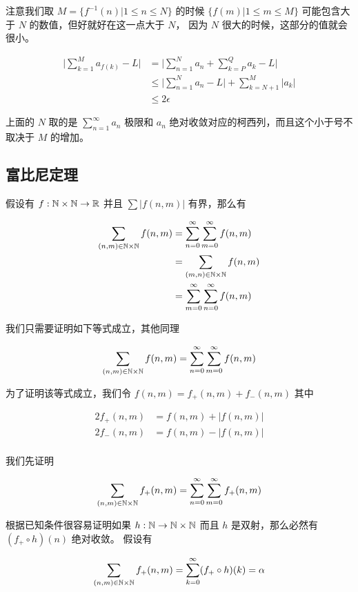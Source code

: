 注意我们取 $M = \{ f^{-1}(n) \vert 1 \le n \le N \} $ 的时候 $ \{ f(m) \vert 1 \le m \le M \}$ 可能包含大于 $N$ 的数值，但好就好在这一点大于 $N$，
因为 $N$ 很大的时候，这部分的值就会很小。

\begin{align*}
\lvert \sum_{k=1}^{M}a_{f(k)} - L \rvert & =  \lvert \sum_{n=1}^{N}a_{n} + \sum_{k=P}^{Q}a_{k} - L \rvert \\
& \le \lvert \sum_{n=1}^{N}a_n - L \rvert + \sum_{k=N+1}^{M}\lvert a_k \rvert \\
& \le 2\epsilon
\end{align*}

上面的 $N$ 取的是 $\sum_{n=1}^{\infty}a_n$ 极限和 $a_n$ 绝对收敛对应的柯西列，而且这个小于号不取决于 $M$ 的增加。

\subsection{富比尼定理}

假设有 $f: \mathbb{N} \times \mathbb{N} \to \mathbb{R}$ 并且 $\sum\lvert f(n,m) \rvert$ 有界，那么有

\begin{align*}
\sum_{(n,m) \in \mathbb{N} \times \mathbb{N}}f(n,m) & = \sum_{n=0}^{\infty}\sum_{m=0}^{\infty}f(n,m) \\
&= \sum_{(m,n) \in \mathbb{N} \times \mathbb{N}}f(n,m) \\
&= \sum_{m=0}^{\infty}\sum_{n=0}^{\infty}f(n,m)
\end{align*}

我们只需要证明如下等式成立，其他同理

\[
\sum_{(n,m) \in \mathbb{N} \times \mathbb{N}}f(n,m) = \sum_{n=0}^{\infty}\sum_{m=0}^{\infty}f(n,m) 
\]

为了证明该等式成立，我们令 $f(n,m) = f_+(n,m) + f_-(n,m)$ 其中

\begin{align*}
2f_+(n,m) &= f(n,m) + \lvert f(n,m)\rvert \\
2f_-(n,m) &= f(n,m) - \lvert f(n,m)\rvert \\
\end{align*}

我们先证明


\[
\sum_{(n,m) \in \mathbb{N} \times \mathbb{N}}f_+(n,m) = \sum_{n=0}^{\infty}\sum_{m=0}^{\infty}f_+(n,m) 
\]

根据已知条件很容易证明如果 $h: \mathbb{N} \to \mathbb{N} \times \mathbb{N}$ 而且 $h$ 是双射，那么必然有 $(f_+ \circ h)(n)$ 绝对收敛。 假设有

\[
\sum_{(n,m) \in \mathbb{N} \times \mathbb{N}}f_+(n,m) = \sum_{k=0}^{\infty} (f_+ \circ h) (k) = \alpha
\]

